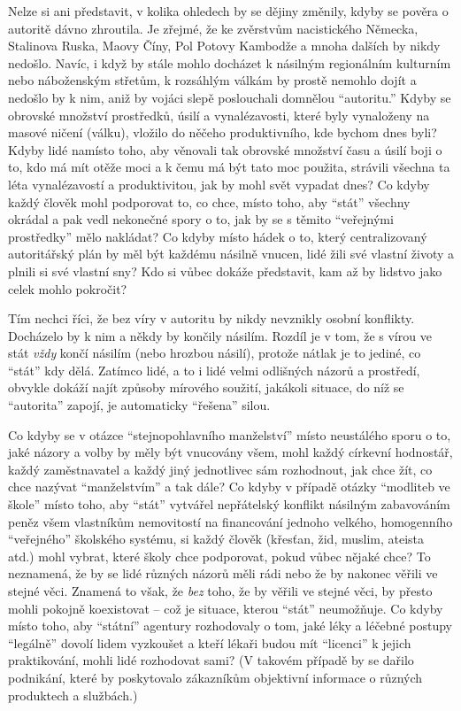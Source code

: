 \documentclass{book}
\begin{document}
Nelze si ani představit, v kolika ohledech by se dějiny změnily, kdyby se pověra o autoritě dávno zhroutila. Je zřejmé, že ke zvěrstvům nacistického Německa, Stalinova Ruska, Maovy Číny, Pol Potovy Kambodže a mnoha dalších by nikdy nedošlo. Navíc, i když by stále mohlo docházet k násilným regionálním kulturním nebo náboženským střetům, k rozsáhlým válkám by prostě nemohlo dojít a nedošlo by k nim, aniž by vojáci slepě poslouchali domnělou \enquote{autoritu.} Kdyby se obrovské množství prostředků, úsilí a vynalézavosti, které byly vynaloženy na masové ničení (válku), vložilo do něčeho produktivního, kde bychom dnes byli? Kdyby lidé namísto toho, aby věnovali tak obrovské množství času a úsilí boji o to, kdo má mít otěže moci a k čemu má být tato moc použita, strávili všechna ta léta vynalézavostí a produktivitou, jak by mohl svět vypadat dnes? Co kdyby každý člověk mohl podporovat to, co chce, místo toho, aby \enquote{stát} všechny okrádal a pak vedl nekonečné spory o to, jak by se s těmito \enquote{veřejnými prostředky} mělo nakládat? Co kdyby místo hádek o to, který centralizovaný autoritářský plán by měl být každému násilně vnucen, lidé žili své vlastní životy a plnili si své vlastní sny? Kdo si vůbec dokáže představit, kam až by lidstvo jako celek mohlo pokročit?

Tím nechci říci, že bez víry v autoritu by nikdy nevznikly osobní konflikty. Docházelo by k nim a někdy by končily násilím. Rozdíl je v tom, že s vírou ve stát \emph{vždy} končí násilím (nebo hrozbou násilí), protože nátlak je to jediné, co \enquote{stát} kdy dělá. Zatímco lidé, a to i lidé velmi odlišných názorů a prostředí, obvykle dokáží najít způsoby mírového soužití, jakákoli situace, do níž se \enquote{autorita} zapojí, je automaticky \enquote{řešena} silou.

Co kdyby se v otázce \enquote{stejnopohlavního manželství} místo neustálého sporu o to, jaké názory a volby by měly být vnucovány všem, mohl každý církevní hodnostář, každý zaměstnavatel a každý jiný jednotlivec sám rozhodnout, jak chce žít, co chce nazývat \enquote{manželstvím} a tak dále? Co kdyby v případě otázky \enquote{modliteb ve škole} místo toho, aby \enquote{stát} vytvářel nepřátelský konflikt násilným zabavováním peněz všem vlastníkům nemovitostí na financování jednoho velkého, homogenního \enquote{veřejného} školského systému, si každý člověk (křesťan, žid, muslim, ateista atd.) mohl vybrat, které školy chce podporovat, pokud vůbec nějaké chce? To neznamená, že by se lidé různých názorů měli rádi nebo že by nakonec věřili ve stejné věci. Znamená to však, že \emph{bez} toho, že by věřili ve stejné věci, by přesto mohli pokojně koexistovat -- což je situace, kterou \enquote{stát} neumožňuje. Co kdyby místo toho, aby \enquote{státní} agentury rozhodovaly o tom, jaké léky a léčebné postupy \enquote{legálně} dovolí lidem vyzkoušet a kteří lékaři budou mít \enquote{licenci} k jejich praktikování, mohli lidé rozhodovat sami? (V takovém případě by se dařilo podnikání, které by poskytovalo zákazníkům objektivní informace o různých produktech a službách.)
\end{document}
